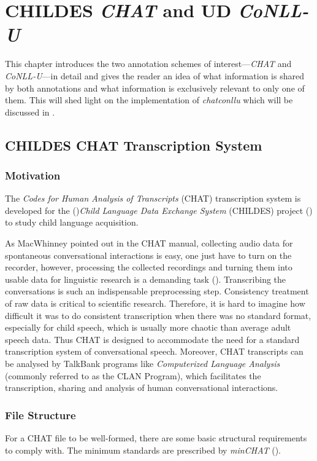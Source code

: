 \chapter{CHILDES \emph{CHAT} and UD \emph{CoNLL-U}}
\label{Chapter2}

This chapter introduces the two annotation schemes of interest---\emph{CHAT} and \emph{CoNLL-U}---in detail and gives the reader an idea of what information is shared by both annotations and what information is exclusively relevant to only one of them. This will shed light on the implementation of \emph{chatconllu} which will be discussed in .

\section{CHILDES CHAT Transcription System}

\subsection{Motivation}
The \emph{Codes for Human Analysis of Transcripts} (CHAT) transcription system is developed for the (\cite{Macwhinney2000})\emph{Child Language Data Exchange System} (CHILDES) project (\cite{Macwhinney2000}) to study child language acquisition.

As MacWhinney pointed out in the CHAT manual, collecting audio data for spontaneous conversational interactions is easy, one just have to turn on the recorder, however, processing the collected recordings and turning them into usable data for linguistic research is a demanding task (\cite{Macwhinney2000}). Transcribing the conversations is such an indispensable preprocessing step. Consistency treatment of raw data is critical to scientific research. Therefore, it is hard to imagine how difficult it was to do consistent transcription when there was no standard format, especially for child speech, which is usually more chaotic than average adult speech data. Thus CHAT is designed to accommodate the need for a standard transcription system of conversational speech. Moreover, CHAT transcripts can be analysed by TalkBank programs  like \emph{Computerized Language Analysis} (commonly referred to as the CLAN Program), which facilitates the transcription, sharing and analysis of human conversational interactions.

\subsection{File Structure}
For a CHAT file to be well-formed, there are some basic structural requirements to comply with. The minimum standards are prescribed by \emph{minCHAT} (\cite{Macwhinney2000}).

